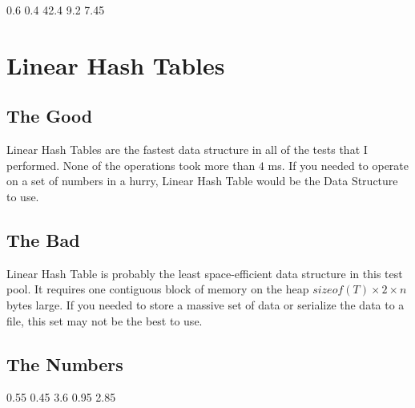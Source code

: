 \documentclass{muformallab}
\begin{document}
   {0.6} {0.4} {42.4} {9.2} {7.45}

  \section{Linear Hash Tables}

  \subsection{The Good}

  Linear Hash Tables are the fastest data structure in all of the tests
  that I performed. None of the operations took more than $4$ ms. If you
  needed to operate on a set of numbers in a hurry, Linear Hash Table
  would be the Data Structure to use.

  \subsection{The Bad}

  Linear Hash Table is probably the least space-efficient data structure
  in this test pool. It requires one contiguous block of memory on the
  heap $sizeof(T) \times 2 \times n$ bytes large. If you needed to store
  a massive set of data or serialize the data to a file, this set may not
  be the best to use.

  \subsection{The Numbers}

   {0.55} {0.45} {3.6} {0.95} {2.85}
\end{document}
